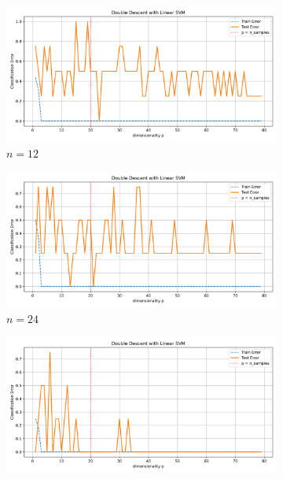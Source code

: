 \documentclass{article}
\begin{document}
\begin{figure}[htb]
  \centering
  \newcommand{\imgwidth}{0.22\textwidth}

  \begin{subfigure}[b]{\imgwidth}
    \includegraphics[width=\linewidth]{img_qq/risk_curve_n5.png}
    \caption{$n=12$}\label{fig:2a1}
  \end{subfigure}%
  \hfill
  \begin{subfigure}[b]{\imgwidth}
    \includegraphics[width=\linewidth]{img_qq/risk_curve_n10.png}
    \caption{$n=24$}\label{fig:2b1}
  \end{subfigure}%
  \hfill
  \begin{subfigure}[b]{\imgwidth}
    \includegraphics[width=\linewidth]{img_qq/risk_curve_n20.png}

\end{subfigure}
\end{figure}
\end{document}
